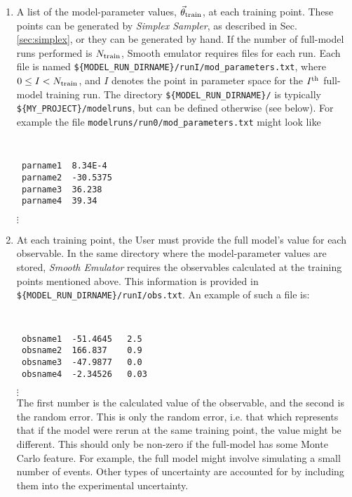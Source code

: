 \documentclass[UserManual.tex]{subfiles}
\begin{document}
\begin{enumerate}
\item A list of the model-parameter values, $\vec{\theta}_{\rm train}$, at each training point. These points can be generated by {\it Simplex Sampler}, as described in Sec. \ref{sec:simplex}, or they can be generated by hand. If the number of full-model runs performed is $N_{\rm train}$, Smooth emulator requires files for each run. Each file is named {\tt \$\{MODEL\_RUN\_DIRNAME\}/runI/mod\_parameters.txt}, where $0\le I<N_{\rm train}$, and $I$ denotes the point in  parameter space for the $I^{\rm th}$ full-model training run. The directory {\tt \$\{MODEL\_RUN\_DIRNAME\}/} is typically {\tt \$\{MY\_PROJECT\}/modelruns}, but can be defined otherwise (see below). For example the file {\tt modelruns/run0/mod\_parameters.txt} might look like
{\tt
\begin{verbatim}
 parname1  8.34E-4
 parname2  -30.5375
 parname3  36.238
 parname4  39.34
\end{verbatim}}
\vspace*{-16pt}
 \hspace*{28pt}$\vdots$\\

\item At each training point, the User must provide the full model's value for each observable. In the same directory where the model-parameter values are stored, {\it Smooth Emulator} requires the observables calculated at the training points mentioned above. This information is provided in {\tt \$\{MODEL\_RUN\_DIRNAME\}/runI/obs.txt}. An example of such a file is:
{\tt
\begin{verbatim}
 obsname1  -51.4645   2.5
 obsname2  166.837    0.9
 obsname3  -47.9877   0.0
 obsname4  -2.34526   0.03
\end{verbatim}}
\vspace*{-16pt}
 \hspace*{28pt}$\vdots$\\
The first number is the calculated value of the observable, and the second is the random error. This is only the random error, i.e. that which represents that if the model were rerun at the same training point, the value might be different. This should only be non-zero if the full-model has some Monte Carlo feature. For example, the full model might involve simulating a small number of events. Other types of uncertainty are accounted for by including them into the experimental uncertainty.



\end{enumerate}
\end{document}
